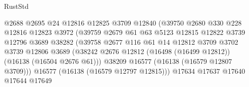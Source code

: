 \begin{lexlean}{RustStd}
\begin{coremodule}
                                        @2688
                                        @2695
                                        @24
                                        @12816
                                        @12825
                                        @3709
                                        @12840
                                        (@39750
                                          @2680
                                          @330
                                          @228
                                          @12816
                                          @12823
                                          @3972
                                          (@39759
                                            @2679
                                            @61
                                            @63
                                            @5123
                                            @12815
                                            @12822
                                            @3739
                                            @12796
                                            @3689
                                            @38282
                                            (@39758
                                              @2677
                                              @116
                                              @61
                                              @14
                                              @12812
                                              @3709
                                              @3702
                                              @3739
                                              @12806
                                              @3689
                                              (@38242
                                                @2676
                                                @12812
                                                (@16498 (@16499 @12812))
                                                (@16138 (@16504 @2676 @61)))
                                              @38209
                                              @16577
                                              (@16138 (@16579 @12807 @3709)))
                                            @16577
                                            (@16138 (@16579 @12797 @12815)))
                                          @17634
                                          @17637
                                          @17640
                                          @17644
                                          @17649

\end{coremodule}
\end{lexlean}
